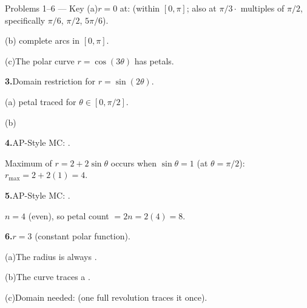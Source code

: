 \documentclass[10pt]{article}
\begin{document}
\begin{notesbox}{Problems 1--6 --- Key}
\vspace{4pt}
(a)\quad $r = 0$ at:  (within $[0,\pi]$; also at $\pi/3 \cdot$ multiples of $\pi/2$, specifically $\pi/6$, $\pi/2$, $5\pi/6$).

\vspace{4pt}
(b)\quad {} complete arcs in $[0, \pi]$.

\vspace{4pt}
(c)\quad The polar curve $r = \cos(3\theta)$ has  petals.

\vspace{0.14in}
\textbf{3.}\quad Domain restriction for $r = \sin(2\theta)$.

\vspace{4pt}
(a)\quad {} petal traced for $\theta \in [0, \pi/2]$.

\vspace{4pt}
(b)\quad {}

\vspace{0.14in}
\textbf{4.}\quad AP-Style MC: .

\begin{teachernote}
Maximum of $r = 2 + 2\sin\theta$ occurs when $\sin\theta = 1$ (at $\theta = \pi/2$):
$r_{\max} = 2 + 2(1) = 4$.
\end{teachernote}

\vspace{0.14in}
\textbf{5.}\quad AP-Style MC: .

\begin{teachernote}
$n = 4$ (even), so petal count $= 2n = 2(4) = 8$.
\end{teachernote}

\vspace{0.14in}
\textbf{6.}\quad $r = 3$ (constant polar function).

\vspace{4pt}
(a)\quad The radius is always .

\vspace{4pt}
(b)\quad The curve traces a .

\vspace{4pt}
(c)\quad Domain needed: \ans{$\theta \in [0, 2\pi]$} (one full revolution traces it once).

\end{notesbox}
\end{document}

